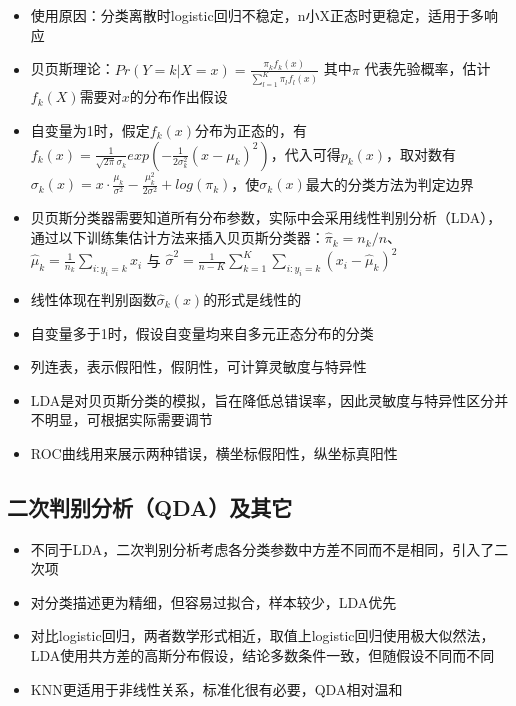 \documentclass[
]{book}
\providecommand{\tightlist}{%
  \setlength{\itemsep}{0pt}\setlength{\parskip}{0pt}}
\begin{document}
\begin{itemize}
\tightlist
\item
  使用原因：分类离散时logistic回归不稳定，n小X正态时更稳定，适用于多响应
\item
  贝页斯理论：\(Pr(Y = k|X = x) = \frac{\pi_k f_k(x)}{\sum_{l = 1}^K \pi_lf_l(x)}\) 其中\(\pi\) 代表先验概率，估计\(f_k(X)\)需要对\(x\)的分布作出假设
\item
  自变量为1时，假定\(f_k(x)\)分布为正态的，有\(f_k(x) = \frac{1}{\sqrt{2 \pi} \sigma_k} exp(- \frac{1}{2 \sigma_k^2} (x - \mu_k)^2)\)，代入可得\(p_k(x)\)，取对数有\(\sigma_k(x) = x \cdot \frac{\mu_k}{\sigma^2} - \frac{\mu_k^2}{2\sigma^2} + log(\pi_k)\)，使\(\sigma_k(x)\)最大的分类方法为判定边界
\item
  贝页斯分类器需要知道所有分布参数，实际中会采用线性判别分析（LDA），通过以下训练集估计方法来插入贝页斯分类器：\(\hat \pi_k = n_k/n\)、\(\hat \mu_k = \frac{1}{n_k} \sum_{i:y_i = k} x_i\) 与 \(\hat \sigma^2 = \frac{1}{n - K} \sum_{k = 1}^K \sum_{i:y_i = k} (x_i - \hat \mu_k)^2\)
\item
  线性体现在判别函数\(\hat \sigma_k(x)\)的形式是线性的
\item
  自变量多于1时，假设自变量均来自多元正态分布的分类
\item
  列连表，表示假阳性，假阴性，可计算灵敏度与特异性
\item
  LDA是对贝页斯分类的模拟，旨在降低总错误率，因此灵敏度与特异性区分并不明显，可根据实际需要调节
\item
  ROC曲线用来展示两种错误，横坐标假阳性，纵坐标真阳性
\end{itemize}

\hypertarget{ux4e8cux6b21ux5224ux522bux5206ux6790qdaux53caux5176ux5b83}{%
\subsection{二次判别分析（QDA）及其它}\label{ux4e8cux6b21ux5224ux522bux5206ux6790qdaux53caux5176ux5b83}}

\begin{itemize}
\tightlist
\item
  不同于LDA，二次判别分析考虑各分类参数中方差不同而不是相同，引入了二次项
\item
  对分类描述更为精细，但容易过拟合，样本较少，LDA优先
\item
  对比logistic回归，两者数学形式相近，取值上logistic回归使用极大似然法，LDA使用共方差的高斯分布假设，结论多数条件一致，但随假设不同而不同
\item
  KNN更适用于非线性关系，标准化很有必要，QDA相对温和
\end{itemize}
\end{document}
